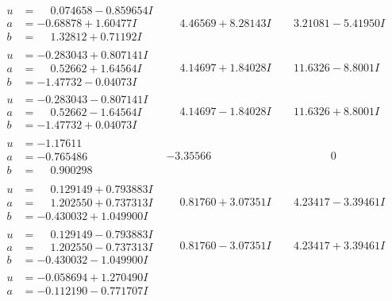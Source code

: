 \documentclass[1p]{elsarticle_modified}
\theoremstyle{definition}
\begin{document}
$$\begin{array}{c|c|c}
\begin{aligned}
u &= \phantom{-}0.074658 - 0.859654 I \\
a &= -0.68878 + 1.60477 I \\
b &= \phantom{-}1.32812 + 0.71192 I\end{aligned}
 & \phantom{-}4.46569 + 8.28143 I & \phantom{-}3.21081 - 5.41950 I \\ \hline\begin{aligned}
u &= -0.283043 + 0.807141 I \\
a &= \phantom{-}0.52662 + 1.64564 I \\
b &= -1.47732 - 0.04073 I\end{aligned}
 & \phantom{-}4.14697 + 1.84028 I & \phantom{-}11.6326 - 8.8001 I \\ \hline\begin{aligned}
u &= -0.283043 - 0.807141 I \\
a &= \phantom{-}0.52662 - 1.64564 I \\
b &= -1.47732 + 0.04073 I\end{aligned}
 & \phantom{-}4.14697 - 1.84028 I & \phantom{-}11.6326 + 8.8001 I \\ \hline\begin{aligned}
u &= -1.17611\phantom{ +0.000000I} \\
a &= -0.765486\phantom{ +0.000000I} \\
b &= \phantom{-}0.900298\phantom{ +0.000000I}\end{aligned}
 & -3.35566\phantom{ +0.000000I} & \phantom{-0.000000 } 0 \\ \hline\begin{aligned}
u &= \phantom{-}0.129149 + 0.793883 I \\
a &= \phantom{-}1.202550 + 0.737313 I \\
b &= -0.430032 + 1.049900 I\end{aligned}
 & \phantom{-}0.81760 + 3.07351 I & \phantom{-}4.23417 - 3.39461 I \\ \hline\begin{aligned}
u &= \phantom{-}0.129149 - 0.793883 I \\
a &= \phantom{-}1.202550 - 0.737313 I \\
b &= -0.430032 - 1.049900 I\end{aligned}
 & \phantom{-}0.81760 - 3.07351 I & \phantom{-}4.23417 + 3.39461 I \\ \hline\begin{aligned}
u &= -0.058694 + 1.270490 I \\
a &= -0.112190 - 0.771707 I \\

\end{aligned}
\end{array}$$
\end{document}
